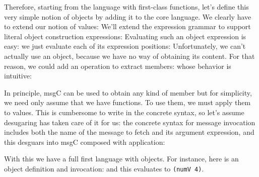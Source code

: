 
Therefore, starting from the language with first-class functions, let’s define
this very simple notion of objects by adding it to the core language. We clearly
have to extend our notion of values:
We’ll extend the expression grammar to support literal object construction
expressions:
Evaluating such an object expression is easy: we just evaluate each of its
expression positions:
Unfortunately, we can’t actually use an object, because we have no way of
obtaining its content. For that reason, we could add an operation to extract
members:
whose behavior is intuitive:


In principle, msgC can be used to obtain any kind of member but for simplicity,
we need only assume that we have functions. To use them, we must apply them to
values. This is cumbersome to write in the concrete syntax, so let’s assume
desugaring has taken care of it for us: the concrete syntax for message
invocation includes both the name of the message to fetch and its argument
expression,
and this desguars into msgC composed with application:

With this we have a full first language with objects. For instance, here is an
object definition and invocation:
and this evaluates to \verb|(numV 4)|.
